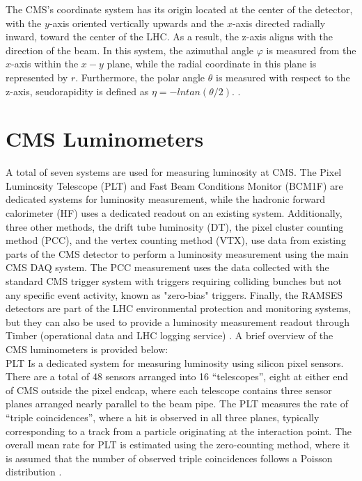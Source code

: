 The CMS's coordinate system has its origin located at the center of the detector, with the $y$-axis oriented vertically upwards and the $x$-axis directed radially inward, toward the center of the LHC. As a result, the z-axis aligns with the direction of the beam. In this system, the azimuthal angle $\varphi$ is measured from the $x$-axis within the $x-y$ plane, while the radial coordinate in this plane is represented by $r$. Furthermore, the polar angle $\theta$ is measured with respect to the z-axis, seudorapidity is defined as $\eta = − ln tan(\theta/2)$. \cite{CMS_Exp_2008}.

\section{CMS Luminometers}

A total of seven systems are used for measuring luminosity at CMS. The Pixel Luminosity Telescope (PLT) and Fast Beam Conditions Monitor (BCM1F) are dedicated systems for luminosity measurement, while the hadronic forward calorimeter (HF) uses a dedicated readout on an existing system. Additionally, three other methods, the drift tube luminosity (DT), the pixel cluster counting method (PCC), and the vertex counting method (VTX), use data from existing parts of the CMS detector to perform a luminosity measurement using the main CMS DAQ system. The PCC measurement uses the data collected with the standard CMS trigger system with triggers requiring colliding bunches but not any specific event activity, known as "zero-bias" triggers. Finally, the RAMSES detectors are part of the LHC environmental protection and monitoring systems, but they can also be used to provide a luminosity measurement readout through Timber (operational data and LHC logging service) \cite{pas_18}.  A brief overview of the CMS luminometers is provided below:\\

PLT Is a dedicated system for measuring luminosity using silicon pixel sensors. There are a total of 48 sensors arranged into 16 “telescopes”, eight at either end of CMS outside the pixel endcap, where each telescope contains three sensor planes arranged nearly parallel to the beam pipe. The PLT measures the rate of “triple coincidences”, where a hit is observed in all three planes, typically corresponding to a track from a particle originating at the interaction point. The overall mean rate for PLT  is estimated using the zero-counting method, where it is assumed that the number of observed triple coincidences follows a Poisson distribution \cite{pas_18}. \\

